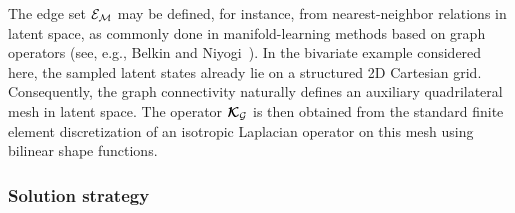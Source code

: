 \documentclass[11pt,a4paper]{article}
\newcommand{\PROMPT}[1]{ }
\begin{document}
\PROMPT{
For a scalar field
$
\phig
=
(\varphi_1,\ldots,\varphi_{\nM})^T
\in\mathbb{R}^{\nM}
$
defined on the sampled latent space, the quadratic form
$
\phig^T\KGs\phig
$
measures its discrete roughness over the graph. The graph regularization
term in \refeq{eq:quadraticGENERAL} therefore penalizes rough variations of the incremental
redistribution
\[
\dW
:=
\Wnew-\Woldrem
\]
across neighboring latent states.
Equivalently, if
\[
\dwi
=
(\dW_{i1},\ldots,\dW_{i\nM})^T
\in\mathbb{R}^{\nM}
\]
denotes the incremental redistribution field associated with the
\(i\)-th retained integration point, then
\[
\operatorname{tr}
\left(
\dW\KGs\dW^T
\right)
=
\sum_{i=1}^{|\Irem|}
\dwi^T\KGs\dwi .
\]
Thus, the graph term is the sum of the graph roughness measures of the
individual weight-update fields.
}



  The edge set \(\mathcal{E}_{\mathcal{M}}\) may be defined, for
instance, from nearest-neighbor relations in latent space, as commonly
done in manifold-learning methods based on graph operators
(see, e.g., Belkin and Niyogi~\cite{belkin2003laplacian}).
In the bivariate example considered here, the sampled latent states
already lie on a structured 2D Cartesian grid. Consequently, the graph
connectivity naturally defines an auxiliary quadrilateral mesh in latent
space. The operator \(\boldsymbol{\mathcal{K}}_{\mathcal{G}}\) is then obtained from the standard finite
element discretization of an isotropic Laplacian operator on this mesh
using bilinear shape functions.










 \subsubsection{Solution strategy}
\label{sec:stagegraph}
\end{document}
